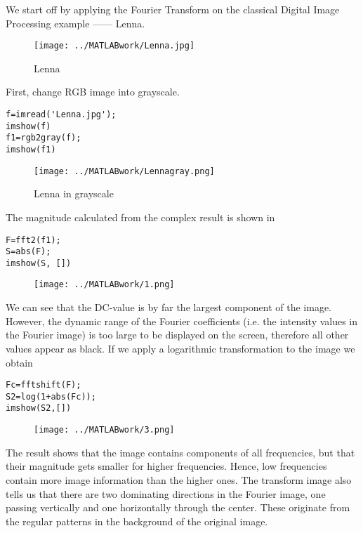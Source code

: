 \documentclass[12pt,a4paper]{article}
\begin{document}
We start off by applying the Fourier Transform on the classical Digital Image Processing example —— Lenna.

\begin{figure}[hbtp]
\centering
\texttt{[image: ../MATLABwork/Lenna.jpg]}
\caption{Lenna}
\end{figure}

First, change RGB image into grayscale. 
\lstset{language=MATLAB}
\begin{lstlisting}
f=imread('Lenna.jpg');
imshow(f)
f1=rgb2gray(f);
imshow(f1)
\end{lstlisting} 
\begin{figure}[hbtp]
\centering
\texttt{[image: ../MATLABwork/Lennagray.png]}
\caption{Lenna in grayscale}
\end{figure}

\newpage
The magnitude calculated from the complex result is shown in
\lstset{language=MATLAB}
\begin{lstlisting}
F=fft2(f1);
S=abs(F);
imshow(S, [])
\end{lstlisting} 


\begin{figure}[hbtp]
\centering
\texttt{[image: ../MATLABwork/1.png]} 
\end{figure}

We can see that the DC-value is by far the largest component of the image. However, the dynamic range of the Fourier coefficients (i.e. the intensity values in the Fourier image) is too large to be displayed on the screen, therefore all other values appear as black. If we apply a logarithmic transformation to the image we obtain
\lstset{language=MATLAB}
\begin{lstlisting}
Fc=fftshift(F);
S2=log(1+abs(Fc));
imshow(S2,[])
\end{lstlisting} 

\begin{figure}[hbtp]
\centering
\texttt{[image: ../MATLABwork/3.png]} 
\end{figure}

The result shows that the image contains components of all frequencies, but that their magnitude gets smaller for higher frequencies. Hence, low frequencies contain more image information than the higher ones. The transform image also tells us that there are two dominating directions in the Fourier image, one passing vertically and one horizontally through the center. These originate from the regular patterns in the background of the original image. 
\end{document}
